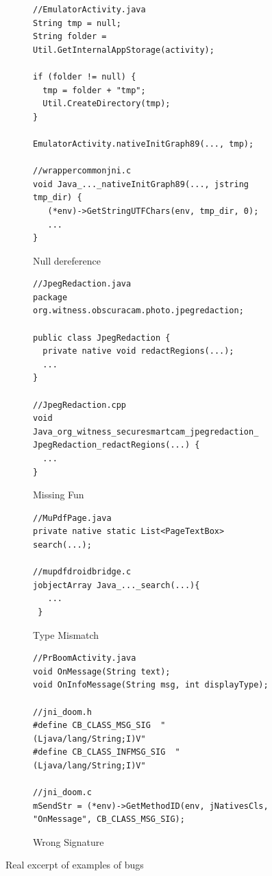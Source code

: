 \begin{figure}[t]
  \centering
  \vspace{2mm}
  \begin{subfigure}[t]{0.5\textwidth}
    \begin{lstlisting}[style=cpp,xleftmargin=2.5em]
//EmulatorActivity.java
String tmp = null;
String folder = Util.GetInternalAppStorage(activity);

if (folder != null) {
  tmp = folder + "tmp";
  Util.CreateDirectory(tmp);
}

EmulatorActivity.nativeInitGraph89(..., tmp);

//wrappercommonjni.c
void Java_..._nativeInitGraph89(..., jstring tmp_dir) {
   (*env)->GetStringUTFChars(env, tmp_dir, 0);
   ...
}
    \end{lstlisting}
    \vspace*{-.5em}
    \caption{Null dereference}
    \label{fig:bug1}
  \end{subfigure}
  \begin{subfigure}[t]{0.5\textwidth}
    \begin{lstlisting}[style=cpp,xleftmargin=2.5em]
//JpegRedaction.java
package org.witness.obscuracam.photo.jpegredaction;

public class JpegRedaction {
  private native void redactRegions(...);
  ...
}

//JpegRedaction.cpp
void
Java_org_witness_securesmartcam_jpegredaction_ JpegRedaction_redactRegions(...) {
  ...
}
    \end{lstlisting}
    \vspace*{-.5em}
    \caption{Missing Fun}
    \label{fig:bug2}
  \end{subfigure}
  \begin{subfigure}[t]{0.5\textwidth}
    \begin{lstlisting}[style=cpp,xleftmargin=2.5em]
//MuPdfPage.java
private native static List<PageTextBox> search(...);

//mupdfdroidbridge.c
jobjectArray Java_..._search(...){
   ...
 }
    \end{lstlisting}
    \vspace*{-.5em}
    \caption{Type Mismatch}
    \label{fig:bug3}
  \end{subfigure}
  \begin{subfigure}[t]{0.5\textwidth}
    \begin{lstlisting}[style=cpp,xleftmargin=2.5em]
//PrBoomActivity.java
void OnMessage(String text);
void OnInfoMessage(String msg, int displayType);

//jni_doom.h
#define CB_CLASS_MSG_SIG  "(Ljava/lang/String;I)V"
#define CB_CLASS_INFMSG_SIG  "(Ljava/lang/String;I)V"

//jni_doom.c
mSendStr = (*env)->GetMethodID(env, jNativesCls, "OnMessage", CB_CLASS_MSG_SIG);

    \end{lstlisting}
    \vspace*{-.5em}
    \caption{Wrong Signature}
    \label{fig:bug3}
  \end{subfigure}
  \vspace*{-.5em}
  \caption{Real excerpt of examples of bugs}
  \label{fig:bugs}
\end{figure}

